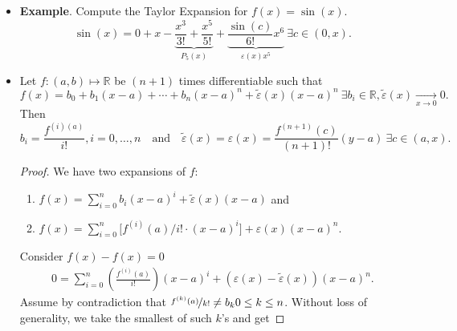 \documentclass{article}
\newcommand{\R}{\mathbb{R}}
\newcommand{\?}{\stackrel{?}{=}}
\theoremstyle{definition} %
\begin{document}
\begin{itemize}
\begin{proof}
\begin{align*}
            g^{(n)}(a) &= g^{(n)}(c_n) = 0, \ \exists c \in (a, b) \text{ such that } g^{(n + 1)}(c) = 0 .
        \end{align*}
        Then we have
        \begin{alignat*}{2}
            && g^{(n + 1)}(x) &= f^{(n + 1)}(x) + \frac{P_n(y) - f(y)}{(y - a)^{n + 1}}(n + 1)! \\
            \iff&& 0 &= f^{(n + 1)}(c) + \frac{P_n(y) - f(y)}{(y - a)^{n + 1}}(n + 1)! \\
            \iff&& f(y) &= P_n(y) + \underbrace{\frac{f^{(n + 1)}(c)}{(n + 1)!}(y - a)^{n + 1}}_{\varepsilon(y)(y - a)^n}.
        \end{alignat*}
        This is the result for $x = y$.
    \end{proof}
    \item \textbf{Example}. Compute the Taylor Expansion for $f(x) = \sin(x)$.
    $$\sin(x) = 0 + x - \underbrace{\frac{x^3}{3!} + \frac{x^5}{5!}}_{P_5(x)} + \underbrace{\frac{\sin(c)}{6!}x^6}_{\varepsilon(x)x^5} \ \exists c \in (0, x).$$
    \item[]
    \begin{lemma}
        Let $f: (a, b) \mapsto \R$ be $(n + 1)$ times differentiable such that
        $$f(x) = b_0 + b_1(x - a) + \cdots + b_n(x - a)^n + \widetilde{\varepsilon}(x)(x - a)^n \ \exists b_i \in \R, \widetilde{\varepsilon}(x) \underset{x \rightarrow 0}{\longrightarrow} 0.$$
        Then
        $$b_i = \frac{f^{(i)(a)}}{i!}, i = 0, \ldots, n \quad \text{and} \quad \widetilde{\varepsilon}(x) = \varepsilon(x) = \frac{f^{(n + 1)}(c)}{(n + 1)!}(y - a) \ \exists c \in (a, x).$$
    \end{lemma}
    \begin{proof}
        We have two expansions of $f$:
        \begin{enumerate}[label=(\roman*)]
            \item $f(x) = \sum_{i = 0}^{n} b_i(x - a)^i + \widetilde{\varepsilon}(x)(x - a)$ and
            \item $f(x) = \sum_{i = 0}^{n} \big[f^{(i)}(a)/i! \cdot (x - a)^i\big] + \varepsilon(x)(x - a)^n$.
        \end{enumerate}
        Consider $f(x) - f(x) = 0$
        \begin{align*}
            0 = \sum_{i = 0}^{n}\left(\frac{f^{(i)}(a)}{i!}\right)(x - a)^i + \left(\varepsilon(x) - \widetilde{\varepsilon}(x)\right)(x - a)^n.
        \end{align*}
        Assume by contradiction that $\nicefrac{f^{(k)}(a)}{k!} \neq b_k 0 \leq k \leq n$. Without loss of generality, we take the smallest of such $k$'s and get

\end{proof}
\end{itemize}
\end{document}
